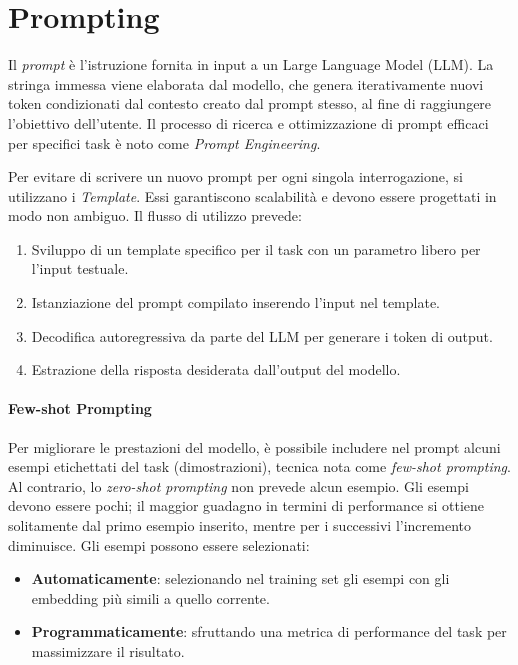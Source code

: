 
\newpage

\section{Prompting}

    Il \textit{prompt} è l'istruzione fornita in input a un Large Language Model (LLM). La stringa immessa viene elaborata dal modello, che genera iterativamente nuovi token condizionati dal contesto creato dal prompt stesso, al fine di raggiungere l'obiettivo dell'utente. Il processo di ricerca e ottimizzazione di prompt efficaci per specifici task è noto come \textit{Prompt Engineering}.

    Per evitare di scrivere un nuovo prompt per ogni singola interrogazione, si utilizzano i \textit{Template}. Essi garantiscono scalabilità e devono essere progettati in modo non ambiguo. Il flusso di utilizzo prevede:
    \begin{enumerate}
        \item Sviluppo di un template specifico per il task con un parametro libero per l'input testuale.
        \item Istanziazione del prompt compilato inserendo l'input nel template.
        \item Decodifica autoregressiva da parte del LLM per generare i token di output.
        \item Estrazione della risposta desiderata dall'output del modello.
    \end{enumerate}

    \paragraph{Few-shot Prompting}

        Per migliorare le prestazioni del modello, è possibile includere nel prompt alcuni esempi etichettati del task (dimostrazioni), tecnica nota come \textit{few-shot prompting}. Al contrario, lo \textit{zero-shot prompting} non prevede alcun esempio.
        Gli esempi devono essere pochi; il maggior guadagno in termini di performance si ottiene solitamente dal primo esempio inserito, mentre per i successivi l'incremento diminuisce. Gli esempi possono essere selezionati:
        
        \begin{itemize}
            \item \textbf{Automaticamente}: selezionando nel training set gli esempi con gli embedding più simili a quello corrente.
            \item \textbf{Programmaticamente}: sfruttando una metrica di performance del task per massimizzare il risultato.
        \end{itemize}

